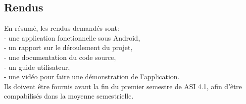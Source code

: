 \subsection{Rendus}
En résumé, les rendus demandés sont:\\
    \indent- une application fonctionnelle sous Android,\\
    \indent- un rapport sur le déroulement du projet,\\
    \indent- une documentation du code source,\\
    \indent- un guide utilisateur,\\
	\indent- une vidéo pour faire une démonstration de l'application.\\
\indent Ils doivent être fournis avant la fin du premier semestre de ASI 4.1, afin d'être compabilisés dans la moyenne semestrielle.
\newpage
